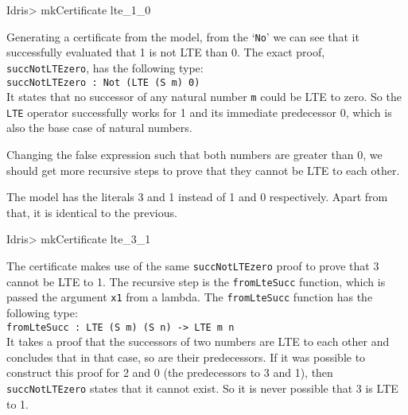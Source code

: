         \begin{code}
Idris> mkCertificate lte_1_0
        \end{code}
        
        Generating a certificate from the model, from the `\texttt{No}' we can see that it successfully evaluated that 1 is not LTE than 0. The exact proof, \texttt{succNotLTEzero}, has the following type:\\
        \texttt{succNotLTEzero : Not (LTE (S m) 0)}\\
        It states that no successor of any natural number \texttt{m} could be LTE to zero. So the \texttt{LTE} operator successfully works for 1 and its immediate predecessor 0, which is also the base case of natural numbers.
        
        
        
        Changing the false expression such that both numbers are greater than 0, we should get more recursive steps to prove that they cannot be LTE to each other.
        
        \newpage
        
        
        The \Idris model has the literals 3 and 1 instead of 1 and 0 respectively. Apart from that, it is identical to the previous.
        
        \begin{code}
Idris> mkCertificate lte_3_1
        \end{code}
        
        The certificate makes use of the same \texttt{succNotLTEzero} proof to prove that 3 cannot be LTE to 1. The recursive step is the \texttt{fromLteSucc} function, which is passed the argument \texttt{x1} from a lambda. The \texttt{fromLteSucc} function has the following type:\\
        \texttt{fromLteSucc : LTE (S m) (S n) -> LTE m n}\\
        It takes a proof that the successors of two numbers are LTE to each other and concludes that in that case, so are their predecessors. If it was possible to construct this proof for 2 and 0 (the predecessors to 3 and 1), then \texttt{succNotLTEzero} states that it cannot exist. So it is never possible that 3 is LTE to 1.
        \\
        
